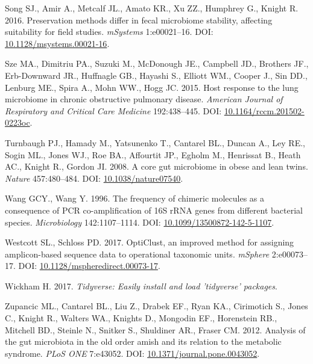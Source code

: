 \documentclass[11pt,]{article}
\begin{document}
\hypertarget{ref-preservation_Song_2016}{}
Song SJ., Amir A., Metcalf JL., Amato KR., Xu ZZ., Humphrey G., Knight
R. 2016. Preservation methods differ in fecal microbiome stability,
affecting suitability for field studies. \emph{mSystems} 1:e00021--16.
DOI:
\href{https://doi.org/10.1128/msystems.00021-16}{10.1128/msystems.00021-16}.

\hypertarget{ref-Sze2015}{}
Sze MA., Dimitriu PA., Suzuki M., McDonough JE., Campbell JD., Brothers
JF., Erb-Downward JR., Huffnagle GB., Hayashi S., Elliott WM., Cooper
J., Sin DD., Lenburg ME., Spira A., Mohn WW., Hogg JC. 2015. Host
response to the lung microbiome in chronic obstructive pulmonary
disease. \emph{American Journal of Respiratory and Critical Care
Medicine} 192:438--445. DOI:
\href{https://doi.org/10.1164/rccm.201502-0223oc}{10.1164/rccm.201502-0223oc}.

\hypertarget{ref-Turnbaugh2008}{}
Turnbaugh PJ., Hamady M., Yatsunenko T., Cantarel BL., Duncan A., Ley
RE., Sogin ML., Jones WJ., Roe BA., Affourtit JP., Egholm M., Henrissat
B., Heath AC., Knight R., Gordon JI. 2008. A core gut microbiome in
obese and lean twins. \emph{Nature} 457:480--484. DOI:
\href{https://doi.org/10.1038/nature07540}{10.1038/nature07540}.

\hypertarget{ref-Wang1996}{}
Wang GCY., Wang Y. 1996. The frequency of chimeric molecules as a
consequence of PCR co-amplification of 16S rRNA genes from different
bacterial species. \emph{Microbiology} 142:1107--1114. DOI:
\href{https://doi.org/10.1099/13500872-142-5-1107}{10.1099/13500872-142-5-1107}.

\hypertarget{ref-opticlust_Westcott_2017}{}
Westcott SL., Schloss PD. 2017. OptiClust, an improved method for
assigning amplicon-based sequence data to operational taxonomic units.
\emph{mSphere} 2:e00073--17. DOI:
\href{https://doi.org/10.1128/mspheredirect.00073-17}{10.1128/mspheredirect.00073-17}.

\hypertarget{ref-tidyverse_2017}{}
Wickham H. 2017. \emph{Tidyverse: Easily install and load 'tidyverse'
packages}.

\hypertarget{ref-Zupancic2012}{}
Zupancic ML., Cantarel BL., Liu Z., Drabek EF., Ryan KA., Cirimotich S.,
Jones C., Knight R., Walters WA., Knights D., Mongodin EF., Horenstein
RB., Mitchell BD., Steinle N., Snitker S., Shuldiner AR., Fraser CM.
2012. Analysis of the gut microbiota in the old order amish and its
relation to the metabolic syndrome. \emph{PLoS ONE} 7:e43052. DOI:
\href{https://doi.org/10.1371/journal.pone.0043052}{10.1371/journal.pone.0043052}.
\end{document}

